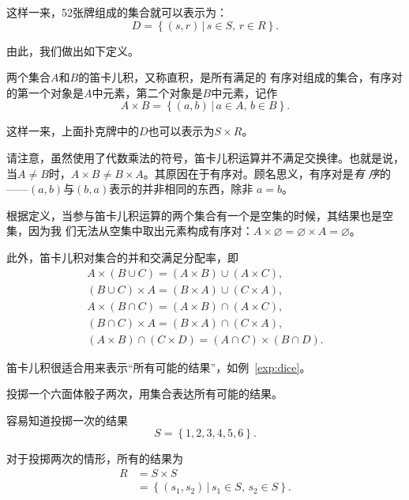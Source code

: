 这样一来，52张牌组成的集合就可以表示为：
\[
    D = \left\{ \left( s,r \right) \,|\, s\in S,\, r\in R \right\}.
\]

由此，我们做出如下定义。

\begin{rawdef}[笛卡儿积]
    两个集合$A$和$B$的笛卡儿积，又称直积，是所有满足的
    有序对组成的集合，有序对的第一个对象是$A$中元素，第二个对象是$B$中元素，记作
    \[
        A \times B = \left\{ \left( a,b \right) \,|\, a\in A,\, b\in B \right\}.
    \]
\end{rawdef}

这样一来，上面扑克牌中的$D$也可以表示为$S\times R$。

请注意，虽然使用了代数乘法的符号，笛卡儿积运算并不满足交换律。也就是说，当$A\neq
B$时，$A \times B \neq B \times A$。其原因在于有序对。顾名思义，有序对是\emph{有
序}的——$\left( a,b \right)$与$\left( b,a \right) $表示的并非相同的东西，除非
$a=b$。

根据定义，当参与笛卡儿积运算的两个集合有一个是空集的时候，其结果也是空集，因为我
们无法从空集中取出元素构成有序对：$A \times \varnothing = \varnothing \times A = 
\varnothing$。

此外，笛卡儿积对集合的并和交满足分配率，即
\begin{align*}
    A\times (B\cup C)=(A\times B)\cup (A\times C),\\
    (B\cup C)\times A=(B\times A)\cup (C\times A),\\
    A\times (B\cap C)=(A\times B)\cap (A\times C),\\
    (B\cap C)\times A=(B\times A)\cap (C\times A),\\
    (A\times B)\cap (C\times D)=(A\cap C)\times (B\cap D).
\end{align*}


笛卡儿积很适合用来表示“所有可能的结果”，如例~\ref{exp:dice}。

\begin{rawexp}\label{exp:dice}
    投掷一个六面体骰子两次，用集合表达所有可能的结果。
\end{rawexp}

\begin{rawsol}
    容易知道投掷一次的结果
    \[
        S = \left\{ 1,2,3,4,5,6 \right\}.
    \]

    对于投掷两次的情形，所有的结果为
    \begin{align*}
        R &= S \times S\\
          &= \left\{ \left( s_{1},s_{2} \right) \,|\, s_{1}\in S,\,s_{2}\in S \right\} .
    \end{align*}
\end{rawsol}

